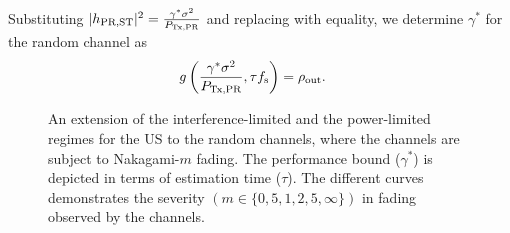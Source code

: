 {Substituting $|h_{\text{PR,ST}}|^2 = \frac{\gamma^* \sigma^2}{P_{\text{Tx,PR}}}$ and replacing with equality, we determine $\gamma^*$ for the random channel as} 
\begin{align*}
g\left(\frac{\gamma^* \sigma^2}{P_{\text{Tx,PR}}}, \tau f_{\text{s}}\right) &= \rho_{\text{out}}. \nonumber  
\end{align*}
\begin{figure}[!t]
\vspace{\figmara}

\centering
{}
\vspace{\figmard}
\caption{An extension of the interference-limited and the power-limited regimes for the US to the random channels, where the channels are subject to Nakagami-$m$ fading. The performance bound ($\gamma^*$) is depicted in terms of estimation time ($\tau$). The different curves demonstrates the severity $(m \in \{0,5,1,2,5, \infty \})$ in fading observed by the channels.}
\label{fig:or_fad}
\vspace{\figmarb}
\end{figure}
